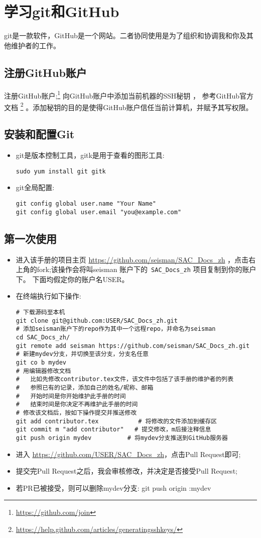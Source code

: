 \section{学习git和GitHub}
git是一款软件，GitHub是一个网站。二者协同使用是为了组织和协调我和你及其他维护者的工作。
\subsection{注册GitHub账户}
注册GitHub账户;\footnote{\url{https://github.com/join}}
向GitHub账户中添加当前机器的SSH秘钥 ， 参考GitHub官方文档
\footnote{\url{https://help.github.com/articles/generating­ssh­keys/}}
。添加秘钥的目的是使得GitHub账户信任当前计算机，并赋予其写权限。
\subsection{安装和配置Git}
\begin{itemize}
\item git是版本控制工具，gitk是用于查看的图形工具:
\begin{verbatim}
sudo yum install git gitk
\end{verbatim}
\item git全局配置:
\begin{verbatim}
git config ­­global user.name "Your Name"
git config ­­global user.email "you@example.com"
\end{verbatim}
\end{itemize}
\subsection{第一次使用}
\begin{itemize}
\item 进入该手册的项目主页 \url{https://github.com/seisman/SAC_Docs_zh}
，点击右上角的fork;该操作会将叫seisman 账户下的~\verb+SAC_Docs_zh+ 项目复制到你的账户下。
下面均假定你的账户名USER。
\item 在终端执行如下操作:
\begin{verbatim}
# 下载源码至本机
git clone git@github.com:USER/SAC_Docs_zh.git
# 添加seisman账户下的repo作为其中一个远程repo，并命名为seisman
cd SAC_Docs_zh/
git remote add seisman https://github.com/seisman/SAC_Docs_zh.git
# 新建mydev分支，并切换至该分支，分支名任意
git co ­b mydev
# 用编辑器修改文档
#   比如先修改contributor.tex文件，该文件中包括了该手册的维护者的列表
#   参照已有的记录，添加自己的姓名/昵称、邮箱
#   开始时间是你开始维护此手册的时间
#   结束时间是你决定不再维护此手册的时间
# 修改该文档后，按如下操作提交并推送修改
git add contributor.tex           # 将修改的文件添加到缓存区
git commit ­m "add contributor"   # 提交修改，­m后接注释信息
git push origin mydev          # 将mydev分支推送到GitHub服务器
\end{verbatim}
\item 进入 \url{https://github.com/USER/SAC_Docs_zh}，点击Pull Request即可;
\item 提交完Pull Request之后，我会审核修改，并决定是否接受Pull Request;
\item 若PR已被接受，则可以删除mydev分支:
git push origin :mydev
\end{itemize}
